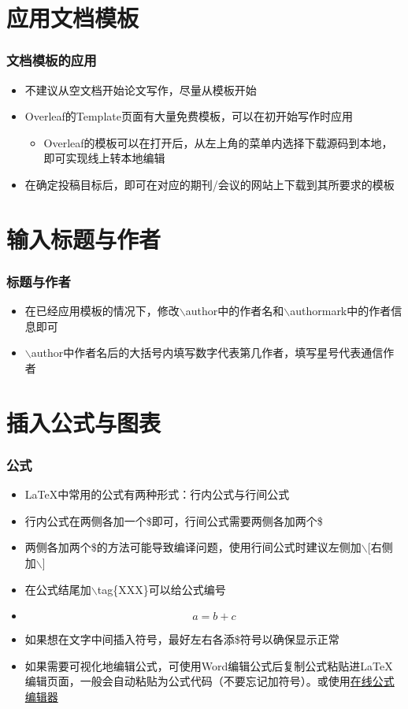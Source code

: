 \documentclass[xetex,mathserif,serif]{beamer}
\begin{document}
\section{应用文档模板}
\begin{frame} 
    \frametitle{文档模板的应用} 
    \begin{itemize} 
        \item 不建议从空文档开始论文写作，尽量从模板开始
        \item Overleaf的Template页面有大量免费模板，可以在初开始写作时应用
        \begin{itemize}
            \item Overleaf的模板可以在打开后，从左上角的菜单内选择下载源码到本地，即可实现线上转本地编辑
        \end{itemize}
        \item 在确定投稿目标后，即可在对应的期刊/会议的网站上下载到其所要求的模板
    \end{itemize} 
\end{frame}

\section{输入标题与作者}
\begin{frame} 
    \frametitle{标题与作者} 
    \begin{itemize} 
        \item 在已经应用模板的情况下，修改$\backslash$author中的作者名和$\backslash$authormark中的作者信息即可
        \item $\backslash$author中作者名后的大括号内填写数字代表第几作者，填写星号代表通信作者
    \end{itemize} 
\end{frame}

\section{插入公式与图表}
\begin{frame} 
    \frametitle{公式} 
    \begin{itemize} 
        \item \LaTeX{}中常用的公式有两种形式：行内公式与行间公式
        \item 行内公式在两侧各加一个\$即可，行间公式需要两侧各加两个\$
        \item 两侧各加两个\$的方法可能导致编译问题，使用行间公式时建议左侧加$\backslash$[右侧加$\backslash$]
        \item 在公式结尾加$\backslash$tag\{XXX\}可以给公式编号
        \item \[a=b+c \tag*{5.1}\]
        \item 如果想在文字中间插入符号，最好左右各添\$符号以确保显示正常
        \item 如果需要可视化地编辑公式，可使用Word编辑公式后复制公式粘贴进\LaTeX{}编辑页面，一般会自动粘贴为公式代码（不要忘记加符号）。或使用\href{https://latex.codecogs.com/eqneditor/editor.php?lang=zh-cn}{在线公式编辑器}
    \end{itemize} 
\end{frame}
\end{document}
